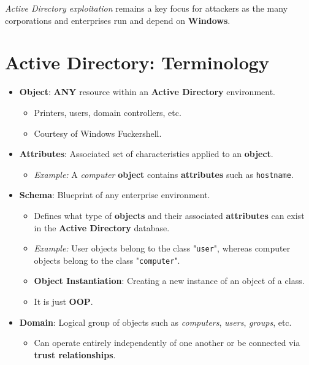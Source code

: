 \documentclass[12pt, letterpaper]{article}
\begin{document}
\bigskip

\textit{Active Directory exploitation} remains a key focus for attackers as the many corporations and enterprises run and depend on \textbf{Windows}.

\section*{Active Directory: Terminology}

\begin{itemize}
    \item \textbf{Object}: \textbf{ANY} resource within an \textbf{Active Directory} environment.
        \begin{itemize}
            \item Printers, users, domain controllers, etc.
            \item Courtesy of Windows Fuckershell.
        \end{itemize}
    \item \textbf{Attributes}: Associated set of characteristics applied to an \textbf{object}.
        \begin{itemize}
            \item \textit{Example:} A \textit{computer} \textbf{object} contains \textbf{attributes} such as \texttt{hostname}.
        \end{itemize}
    \item \textbf{Schema}: Blueprint of any enterprise environment.
        \begin{itemize}
            \item Defines what type of \textbf{objects} and their associated \textbf{attributes} can exist in the \textbf{Active Directory} database.
            \item \textit{Example:} User objects belong to the class "\texttt{user}", whereas computer objects belong to the class "\texttt{computer}".
            \item \textbf{Object Instantiation}: Creating a new instance of an object of a class.
            \item It is just \textbf{OOP}.
        \end{itemize}
    \item \textbf{Domain}: Logical group of objects such as \textit{computers}, \textit{users}, \textit{groups}, etc.
        \begin{itemize}
            \item Can operate entirely independently of one another or be connected via \textbf{trust relationships}.

\end{itemize}
\end{itemize}
\end{document}
